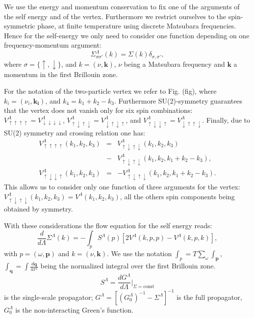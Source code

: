 We use the energy and momentum conservation to fix one of the arguments of the self energy and of the vertex. 
Furthermore we restrict ourselves to the spin-symmetric phase, at finite temperature using discrete Matsubara frequencies. 
Hence for the self-energy  we only need to consider one function depending on one frequency-momentum argument: 
\begin{equation}
\Sigma^\Lambda_{\sigma\sigma'}(k)=\Sigma(k)\delta_{\sigma,\sigma'}, 
\end{equation}
where $\sigma = \{\uparrow, \downarrow\} $, and $k=(\nu,\mathbf{k})$, $\nu$ being a Matsubara frequency and $\mathbf{k}$ a momentum in the first Brillouin zone. 

For the notation of the two-particle vertex we refer to Fig. (fig), where $k_i=(\nu_i,\mathbf{k_i})$,
and $k_4=k_1+k_2-k_3$. 
Furthermore  SU(2)-symmetry guarantees that the vertex does not vanish only for six spin combinations\cite{Rohringer2012}:
$
 V^\Lambda_{\uparrow\uparrow\uparrow\uparrow} = V^\Lambda_{\downarrow\downarrow\downarrow\downarrow}$, 
$  V^\Lambda_{\uparrow\downarrow\uparrow\downarrow} = V^\Lambda_{\downarrow\uparrow\downarrow\uparrow}  $, and
$  V^\Lambda_{\uparrow\downarrow\downarrow\uparrow } = V^\Lambda_{\downarrow\uparrow\uparrow\downarrow}$.   
Finally, due to SU(2) symmetry and crossing relation one has: 
\begin{eqnarray}
\nonumber
V^\Lambda_{\uparrow\uparrow\uparrow\uparrow}(k_1,k_2,k_3) &=& V^\Lambda_{\uparrow\downarrow\uparrow\downarrow}(k_1,k_2,k_3)\\&-& V^\Lambda_{\uparrow\downarrow\uparrow\downarrow}(k_1,k_2,k_1+k_2-k_3), \\ 
V^\Lambda_{\uparrow\downarrow\downarrow\uparrow}(k_1,k_2,k_3)& =& -V^\Lambda_{\uparrow\downarrow\uparrow\downarrow}(k_1,k_2,k_1+k_2-k_3).
\end{eqnarray}
This allows us to consider only one function of three arguments for the vertex:  $V^\Lambda_{\uparrow\downarrow\uparrow\downarrow}(k_1,k_2,k_3)=V^\Lambda(k_1,k_2,k_3)$, all the others spin components being obtained by symmetry. 

With these considerations the flow equation for the self energy reads: 
\begin{equation}
\frac{d}{d \Lambda} \Sigma^\Lambda(k)= -\int_p  S^\Lambda(p)\left[2V^\Lambda(k,p,p) -V^\Lambda(k,p,k)\right], 
\end{equation}
with $p=(\omega,\mathbf{p})$ and $k = (\nu,\mathbf{k})$. We use the notation  $\int_{p} =T\sum_\omega \int_{\mathbf{p}}$, $\int_{\mathbf{q}}=\int  \frac{d\mathbf{q}}{4\pi^2}$ being the normalized integral over the first Brillouin zone. 
\begin{equation}
 S^\Lambda=\frac{dG^\Lambda}{d\Lambda}\Bigg|_{\Sigma=\mathrm{const}} 
\end{equation}
  is the single-scale propagator; $G^\Lambda=\left[(G_0^\Lambda)^{-1}-\Sigma^\Lambda\right]^{-1}$ is the full propagator,  $G_0^\Lambda$ is the non-interacting Green's function. 
  
